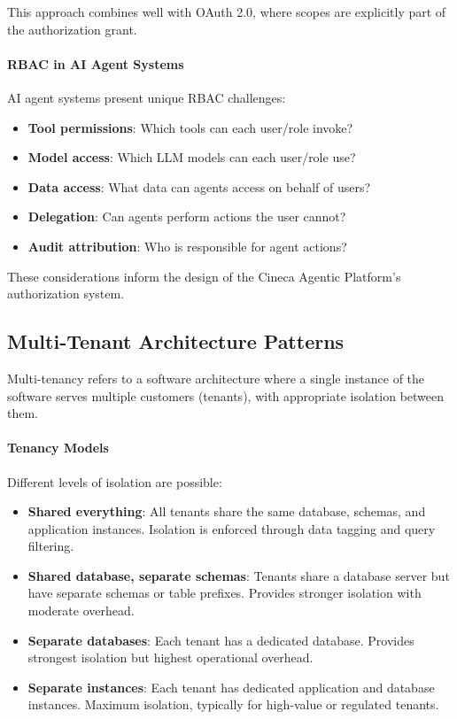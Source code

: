 This approach combines well with OAuth 2.0, where scopes are explicitly part of the authorization grant.

\paragraph{RBAC in AI Agent Systems}

AI agent systems present unique RBAC challenges:

\begin{itemize}
    \item \textbf{Tool permissions}: Which tools can each user/role invoke?
    \item \textbf{Model access}: Which LLM models can each user/role use?
    \item \textbf{Data access}: What data can agents access on behalf of users?
    \item \textbf{Delegation}: Can agents perform actions the user cannot?
    \item \textbf{Audit attribution}: Who is responsible for agent actions?
\end{itemize}

These considerations inform the design of the Cineca Agentic Platform's authorization system.

\subsection{Multi-Tenant Architecture Patterns}

Multi-tenancy refers to a software architecture where a single instance of the software serves multiple customers (tenants), with appropriate isolation between them.

\paragraph{Tenancy Models}

Different levels of isolation are possible:

\begin{itemize}
    \item \textbf{Shared everything}: All tenants share the same database, schemas, and application instances. Isolation is enforced through data tagging and query filtering.
    
    \item \textbf{Shared database, separate schemas}: Tenants share a database server but have separate schemas or table prefixes. Provides stronger isolation with moderate overhead.
    
    \item \textbf{Separate databases}: Each tenant has a dedicated database. Provides strongest isolation but highest operational overhead.
    
    \item \textbf{Separate instances}: Each tenant has dedicated application and database instances. Maximum isolation, typically for high-value or regulated tenants.
\end{itemize}

